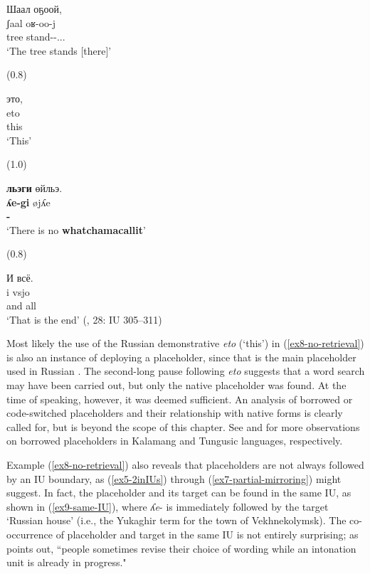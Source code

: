 \documentclass[output=paper,colorlinks,citecolor=brown
\ChapterDOI{10.5281/zenodo.15697581}
]{langscibook}
\begin{document}
\begin{exe}
\ex \label{ex8-no-retrieval}
    \glll Шаал оҕоой, \\
    ʃaal oʁ-oo-j \\
    tree stand-\Res-\Ass.\Intr.\Ef.\Tsg{} \\
    \glt `The tree stands [there]'

\sn (0.8)

\sn
    \glll это, \\
    eto \\
    this \\
    \glt `This'

\sn (1.0)

\sn 
    \glll \textbf{льэги} өйльэ. \\
    \textbf{ʎe-gi} øjʎe \\
    \textbf{\Ph-\Third\Poss{}} \Neg{} \\
    \glt `There is no \textbf{whatchamacallit}'

\sn (0.8)

\sn 
    \glll И всё. \\
    i vsjo \\
    and all \\
    \glt `That is the end' \hfill (\citealt{Nikolaeva_Mayer2004}, 28: IU 305--311)
\end{exe}

Most likely the use of the Russian demonstrative \textit{eto} (`this') in (\ref{ex8-no-retrieval}) is also an instance of deploying a placeholder, since that is the main placeholder used in Russian \citep{Podlesskaya2010}. 
The second-long pause following \textit{eto} suggests that a word search may have been carried out, but only the native placeholder was found.
At the time of speaking, however, it was deemed sufficient. 
An analysis of borrowed or code-switched placeholders and their relationship with native forms is clearly called for, but is beyond the scope of this chapter.
See \citet{chapters/visser} and \citet{chapters/klyachko} for more observations on borrowed placeholders in Kalamang and Tungusic languages, respectively. 

Example (\ref{ex8-no-retrieval}) also reveals that placeholders are not always followed by an IU boundary, as (\ref{ex5-2inIUs}) through (\ref{ex7-partial-mirroring}) might suggest. 
In fact, the placeholder and its target can be found in the same IU, as shown in (\ref{ex9-same-IU}), where \textit{ʎe}- is immediately followed by the target `Russian house' (i.e., the Yukaghir term for the town of Vekhnekolymsk). 
The co-occurrence of placeholder and target in the same IU is not entirely surprising; as \citet[63]{Chafe1994} points out, ``people sometimes revise their choice of wording while an intonation unit is already in progress." 
\end{document}
